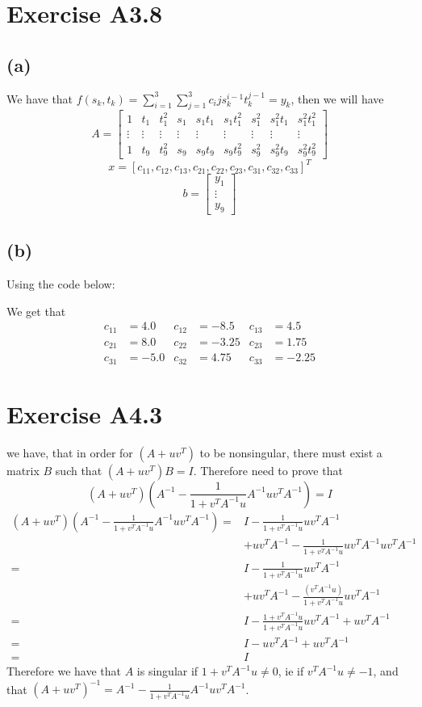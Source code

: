 \section*{Exercise A3.8}
\subsection*{(a)}
We have that $f(s_k,t_k)=\sum_{i=1}^{3}\sum_{j=1}^{3}c_ijs_k^{i-1}t_k^{j-1}=y_k$, then we will have
$$A=\begin{bmatrix}
    1&t_1&t_1^2&s_1&s_1t_1&s_1t_1^2&s_1^2&s_1^2t_1&s_1^2t_1^2\\
    \vdots & \vdots & \vdots & \vdots & \vdots & \vdots & \vdots & \vdots & \vdots\\
    1&t_9&t_9^2&s_9&s_9t_9&s_9t_9^2&s_9^2&s_9^2t_9&s_9^2t_9^2
\end{bmatrix}$$
$$x=[c_11,c_12,c_13,c_21,c_22,c_23,c_31,c_32,c_33]^T$$
$$b=\begin{bmatrix}
    y_1\\
    \vdots\\
    y_9
\end{bmatrix}$$
\subsection*{(b)}
Using the code below:

We get that 
$$\begin{matrix}
    c_{11}&=4.0&c_{12}&=-8.5&c_{13}&=4.5\\
    c_{21}&=8.0&c_{22}&=-3.25&c_{23}&=1.75\\
    c_{31}&=-5.0&c_{32}&=4.75&c_{33}&=-2.25
\end{matrix}$$
\section*{Exercise A4.3}
we have, that in order for $(A+uv^T)$ to be nonsingular, there must
exist a matrix $B$ such that $(A+uv^T)B=I$. Therefore need to prove that
$$(A+uv^T)\left(A^{-1}-\frac{1}{1+v^TA^{-1}u}A^{-1}uv^TA^{-1}\right)=I$$
\begin{align*}
    (A+uv^T)\left(A^{-1}-\frac{1}{1+v^TA^{-1}u}A^{-1}uv^TA^{-1}\right)=&I-\frac{1}{1+v^TA^{-1}u}uv^TA^{-1}\\
                &+uv^T A^{-1}-\frac{1}{1+v^TA^{-1}u}uv^TA^{-1}uv^TA^{-1}\\
                =&I-\frac{1}{1+v^TA^{-1}u}uv^TA^{-1}\\
                &+uv^T A^{-1}-\frac{(v^TA^{-1}u)}{1+v^TA^{-1}u}uv^TA^{-1}\\
                =&I-\frac{1+v^TA^{-1}u}{1+v^TA^{-1}u}uv^TA^{-1}+uv^T A^{-1}\\
                =&I-uv^T A^{-1}+uv^T A^{-1}\\
                =&I
\end{align*}
Therefore we have that $A$ is singular if $1+v^TA^{-1}u\neq 0$, ie if $v^TA^{-1}u\neq -1$, 
and that $(A+uv^T)^{-1}=A^{-1}-\frac{1}{1+v^TA^{-1}u}A^{-1}uv^TA^{-1}$.
